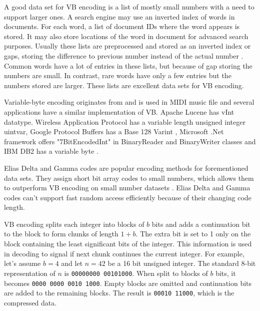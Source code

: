 A good data set for VB encoding is a list of mostly small numbers with a need to support larger ones. A search engine may use an inverted index of 
words in documents. For each word, a list of document IDs where the word appears is stored. It may also store locations of the word in document for 
advanced search purposes. Usually these lists are preprocessed and stored as an inverted index or gaps, storing the difference to previous number 
instead of the actual number \citep{Man08}. Common words have a lot of entries in these lists, but because of gap storing the numbers are small. 
In contrast, rare words have only a few entries but the numbers stored are larger. These lists are excellent data sets for VB encoding. 

Variable-byte encoding originates from and is used in MIDI music file \citep{Mid96} and several applications have a similar implementation of VB. Apache 
Lucene has vInt datatype. Wireless Application Protocol has a variable length unsigned integer uintvar, Google Protocol Buffers has a Base 128 Varint \citep{GooPB},
 Microsoft .Net framework offers "7BitEncodedInt" in BinaryReader and BinaryWriter classes and IBM DB2 has a variable byte  \citep{Bha09}.

Elias Delta and Gamma codes \citep{Eli75} are popular encoding methods for forementioned data sets. They assign short bit array codes to small numbers, 
which allows them to outperform VB encoding on small number datasets . Elias Delta and Gamma codes can't support fast random access efficiently because
of their changing code length.

VB encoding splits each integer into blocks of $b$ bits and adds a continuation bit to the block to form chunks of length $1+b$. The extra bit is set to 1 only
on the block containing the least significant bits of the integer. This information is used in decoding to signal if next chunk continues the current 
integer. For example, let's assume $b = 4$ and let $n = 42$ be a 16 bit unsigned integer. The standard 8-bit representation of $n$ is 
\texttt{00000000 00101000}. When split to blocks of $b$ bits, it becomes \texttt{0000 0000 0010 1000}. Empty blocks are omitted and continuation bits 
are added to the remaining blocks. The result is \texttt{00010 11000}, which is the compressed data.


